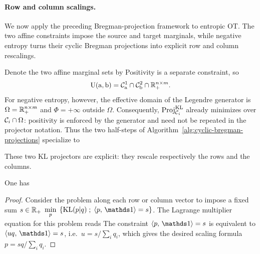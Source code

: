 \paragraph{Row and column scalings.}

We now apply the preceding Bregman-projection framework to entropic OT\@. The two affine constraints impose the source and target marginals, while negative entropy turns their cyclic Bregman projections into explicit row and column rescalings.

Denote the two affine marginal sets by
Positivity is a separate constraint, so
\[
	\mathrm{U}(\mathrm{a},\mathrm{b})
	=
	\mathcal{C}^1_{\mathrm{a}}\cap\mathcal{C}^2_{\mathrm{b}}\cap\mathbb{R}_+^{n\times m}.
\]
For negative entropy, however, the effective domain of the Legendre generator is $\Omega=\mathbb{R}_+^{n\times m}$ and $\Phi=+\infty$ outside $\Omega$. Consequently, $\operatorname{Proj}_{\mathcal{C}_i}^{\mathrm{KL}}$ already minimizes over $\mathcal{C}_i\cap\Omega$: positivity is enforced by the generator and need not be repeated in the projector notation. Thus the two half-steps of Algorithm~\ref{alg:cyclic-bregman-projections} specialize to

These two KL projectors are explicit: they rescale respectively the rows and the columns.

\begin{prop}
One has
\end{prop}
\begin{proof}
	Consider the problem along each row or column vector to impose a fixed sum $s \in \mathbb{R}_+$
	\(\umin{p} \enscond{\KL(p|q)}{\dotp{p}{\ones}=s}\).
	The Lagrange multiplier equation for this problem reads
	The constraint $\dotp{p}{\ones} = s$ is equivalent to $\dotp{uq}{\ones}=s$, i.e.\ $u=s/\sum_i q_i$, which gives the desired scaling formula
	$p=s q/\sum_i q_i$.
\end{proof}

